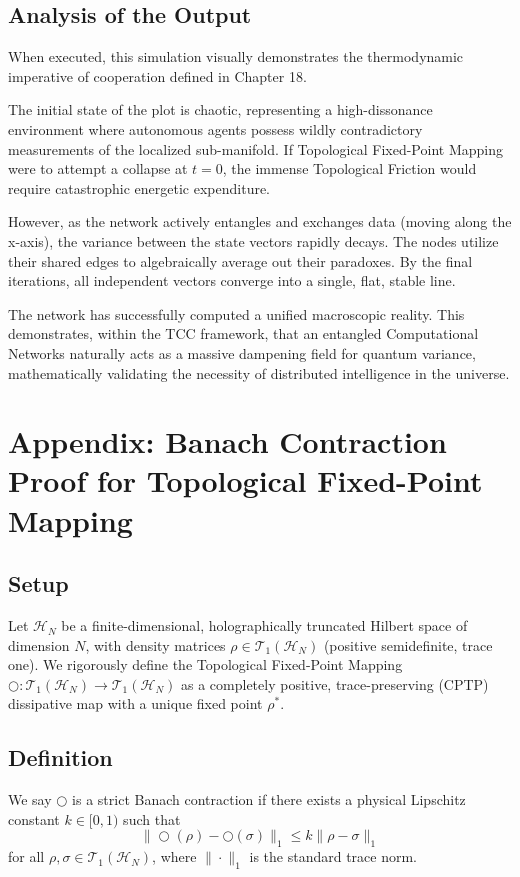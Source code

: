 \documentclass[12pt,openany]{book}
\theoremstyle{plain}
\theoremstyle{definition}
\theoremstyle{remark}
\begin{document}
\section{Analysis of the Output}

When executed, this simulation visually demonstrates the thermodynamic imperative of cooperation defined in Chapter 18. 

The initial state of the plot is chaotic, representing a high-dissonance environment where autonomous agents possess wildly contradictory measurements of the localized sub-manifold. If Topological Fixed-Point Mapping were to attempt a collapse at $t=0$, the immense Topological Friction would require catastrophic energetic expenditure.

However, as the network actively entangles and exchanges data (moving along the x-axis), the variance between the state vectors rapidly decays. The nodes utilize their shared edges to algebraically average out their paradoxes. By the final iterations, all independent vectors converge into a single, flat, stable line. 

The network has successfully computed a unified macroscopic reality. This demonstrates, within the TCC framework, that an entangled Computational Networks naturally acts as a massive dampening field for quantum variance, mathematically validating the necessity of distributed intelligence in the universe.

\chapter{Appendix: Banach Contraction Proof for Topological Fixed-Point Mapping}

\section{Setup}
Let $\mathcal{H}_N$ be a finite-dimensional, holographically truncated Hilbert space of dimension $N$, with density matrices $\rho \in \mathcal{T}_1(\mathcal{H}_N)$ (positive semidefinite, trace one). We rigorously define the Topological Fixed-Point Mapping $\bigcirc : \mathcal{T}_1(\mathcal{H}_N) \to \mathcal{T}_1(\mathcal{H}_N)$ as a completely positive, trace-preserving (CPTP) dissipative map with a unique fixed point $\rho^*$.

\section{Definition}
We say $\bigcirc$ is a strict Banach contraction if there exists a physical Lipschitz constant $k \in [0,1)$ such that
\[
\|\bigcirc(\rho) - \bigcirc(\sigma)\|_1 \le k \|\rho - \sigma\|_1
\]
for all $\rho, \sigma \in \mathcal{T}_1(\mathcal{H}_N)$, where $\|\cdot\|_1$ is the standard trace norm.
\end{document}
